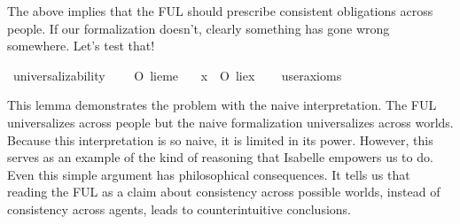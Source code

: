 \begin{isabellebody}
\begin{isamarkuptext}
The above implies that the FUL should prescribe consistent obligations across people. If our formalization
doesn't, clearly something has gone wrong somewhere. Let's test that!%
\end{isamarkuptext}\isamarkuptrue%
\isamarkupfalse%
\ universalizability{\isacharcolon}\isanewline
\ \ \ {\isachardoublequoteopen}{\isasymTurnstile}\ O\ {\isacharbraceleft}{\isacharparenleft}lie{\isacharparenleft}me{\isacharparenright}{\isacharparenright}{\isacharbraceright}{\isachardoublequoteclose}\isanewline
\ \ \ {\isachardoublequoteopen}{\isasymforall}x{\isachardot}\ {\isasymTurnstile}\ {\isacharparenleft}O\ {\isacharbraceleft}{\isacharparenleft}lie{\isacharparenleft}x{\isacharparenright}{\isacharparenright}{\isacharbraceright}{\isacharparenright}{\isachardoublequoteclose}\isanewline
\ \ \isamarkupfalse%
\ {\isacharbrackleft}user{\isacharunderscore}axioms{\isacharbrackright}%
\isadelimproof
\ %
\endisadelimproof
%
\isatagproof
{}\isamarkupfalse%
\isanewline
%
%
\endisatagproof
{\isafoldproof}%
%
\isadelimproof
%
\endisadelimproof
%
\begin{isamarkuptext}%
This lemma demonstrates the problem with the naive interpretation. The FUL universalizes across people
but the naive formalization universalizes across worlds. Because this interpretation is so naive, it is 
limited in its power. However, this serves as an example of the kind of reasoning that 
Isabelle empowers us to do. Even this simple argument has philosophical consequences. It tells us that
reading the FUL as a claim about consistency across possible worlds, instead of consistency across 
agents, leads to counterintuitive conclusions.%
\end{isamarkuptext}\isamarkuptrue%
%
\isadelimtheory
%
\endisadelimtheory
%
\isatagtheory
{}\isamarkupfalse%
%
\endisatagtheory
{\isafoldtheory}%
%
\isadelimtheory
%
\endisadelimtheory
\isanewline
%
\end{isabellebody}%
\endinput

